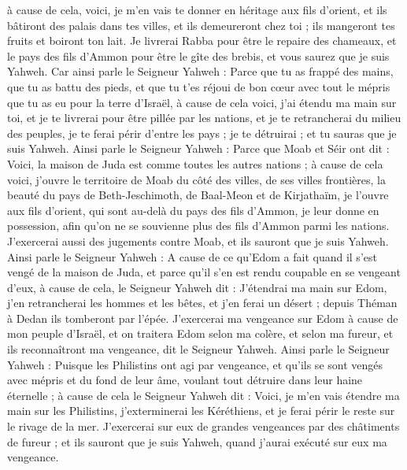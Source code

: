 \begin{multicols}{2}
à cause de cela, voici, je m'en vais te donner en héritage aux fils d'orient, et ils bâtiront des palais dans tes villes, et ils demeureront chez toi ; ils mangeront tes fruits et boiront ton lait.
Je livrerai Rabba pour être le repaire des chameaux, et le pays des fils d'Ammon pour être le gîte des brebis, et vous saurez que je suis Yahweh.
Car ainsi parle le Seigneur Yahweh : Parce que tu as frappé des mains, que tu as battu des pieds, et que tu t'es réjoui de bon cœur avec tout le mépris que tu as eu pour la terre d'Israël,
à cause de cela voici, j'ai étendu ma main sur toi, et je te livrerai pour être pillée par les nations, et je te retrancherai du milieu des peuples, je te ferai périr d'entre les pays ; je te détruirai ; et tu sauras que je suis Yahweh.
Ainsi parle le Seigneur Yahweh : Parce que Moab et Séir ont dit : Voici, la maison de Juda est comme toutes les autres nations ;
à cause de cela voici, j'ouvre le territoire de Moab du côté des villes, de ses villes frontières, la beauté du pays de Beth-Jeschimoth, de Baal-Meon et de Kirjathaïm,
je l'ouvre aux fils d'orient, qui sont au-delà du pays des fils d'Ammon, je leur donne en possession, afin qu'on ne se souvienne plus des fils d'Ammon parmi les nations.
J'exercerai aussi des jugements contre Moab, et ils sauront que je suis Yahweh.
Ainsi parle le Seigneur Yahweh : A cause de ce qu'Edom a fait quand il s'est vengé de la maison de Juda, et parce qu'il s'en est rendu coupable en se vengeant d'eux,
à cause de cela, le Seigneur Yahweh dit : J'étendrai ma main sur Edom, j'en retrancherai les hommes et les bêtes, et j'en ferai un désert ; depuis Théman à Dedan ils tomberont par l'épée.
J'exercerai ma vengeance sur Edom à cause de mon peuple d'Israël, et on traitera Edom selon ma colère, et selon ma fureur, et ils reconnaîtront ma vengeance, dit le Seigneur Yahweh.
Ainsi parle le Seigneur Yahweh : Puisque les Philistins ont agi par vengeance, et qu'ils se sont vengés avec mépris et du fond de leur âme, voulant tout détruire dans leur haine éternelle ;
à cause de cela le Seigneur Yahweh dit : Voici, je m'en vais étendre ma main sur les Philistins, j'exterminerai les Kéréthiens, et je ferai périr le reste sur le rivage de la mer.
J'exercerai sur eux de grandes vengeances par des châtiments de fureur ; et ils sauront que je suis Yahweh, quand j'aurai exécuté sur eux ma vengeance.

\end{multicols}
